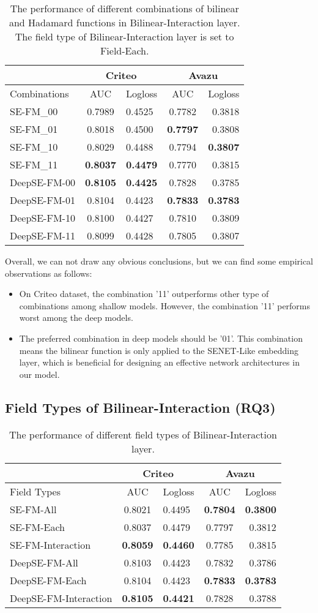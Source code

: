 \documentclass[sigconf]{acmart}
\begin{document}
\begin{table}[!htp]
  \caption{The performance of different combinations of bilinear and Hadamard functions in Bilinear-Interaction layer. The field type of Bilinear-Interaction layer is set to Field-Each.}
  \label{table:t3}
  \begin{tabular}{lclcr}
    \toprule
     &\multicolumn{2}{c}{Criteo}&\multicolumn{2}{c}{Avazu}\\
    \hline
     Combinations & AUC & Logloss & AUC & Logloss\\
    \midrule
SE-FM\_00 & 0.7989 & 0.4525 & 0.7782 & 0.3818\tabularnewline
SE-FM\_01 & 0.8018 & 0.4500 & \textbf{0.7797} & 0.3808\tabularnewline
SE-FM\_10 & 0.8029 & 0.4488 & 0.7794 & \textbf{0.3807}\tabularnewline
SE-FM\_11 & \textbf{0.8037} & \textbf{0.4479} & 0.7770 & 0.3815\tabularnewline
\hline
DeepSE-FM-00 & \textbf{0.8105} & \textbf{0.4425} & 0.7828 & 0.3785\tabularnewline
DeepSE-FM-01 & 0.8104 & 0.4423 & \textbf{0.7833} &
\textbf{0.3783}\tabularnewline
DeepSE-FM-10 & 0.8100 & 0.4427 & 0.7810 & 0.3809\tabularnewline
DeepSE-FM-11 & 0.8099 & 0.4428 & 0.7805 & 0.3807\tabularnewline
  \bottomrule
\end{tabular}
\end{table}
Overall, we can not draw any obvious conclusions, but we can find some
empirical observations as follows:

\begin{itemize}
\item
  On Criteo dataset, the combination '11' outperforms other type of combinations among
  shallow models. However, the combination '11' performs worst among the
  deep models.
\item
  The preferred combination in deep models should be '01'. This combination means the
  bilinear function is only applied to the SENET-Like embedding layer,
  which is beneficial for designing an effective network architectures
  in our model.
\end{itemize}

\subsection{Field Types of Bilinear-Interaction (RQ3)}
\label{sec:s44}
\begin{table}[!htp]
  \caption{The performance of different field types of
Bilinear-Interaction layer.}
  \label{table:t4}
  \begin{tabular}{lclcr}
    \toprule
     &\multicolumn{2}{c}{Criteo}&\multicolumn{2}{c}{Avazu}\\
    \hline
     Field Types & AUC & Logloss & AUC & Logloss\\
    \midrule
SE-FM-All & 0.8021 & 0.4495 & \textbf{0.7804} & \textbf{0.3800}\tabularnewline
SE-FM-Each & 0.8037 & 0.4479 & 0.7797 & 0.3812\tabularnewline
SE-FM-Interaction & \textbf{0.8059} & \textbf{0.4460} & 0.7785 &
0.3815\tabularnewline
\hline
DeepSE-FM-All & 0.8103 & 0.4423 & 0.7832 & 0.3786\tabularnewline
DeepSE-FM-Each & 0.8104 & 0.4423 & \textbf{0.7833} &
\textbf{0.3783}\tabularnewline
DeepSE-FM-Interaction & \textbf{0.8105} & \textbf{0.4421} & 0.7828 &
0.3788\tabularnewline
  \bottomrule
\end{tabular}
\end{table}
\end{document}
